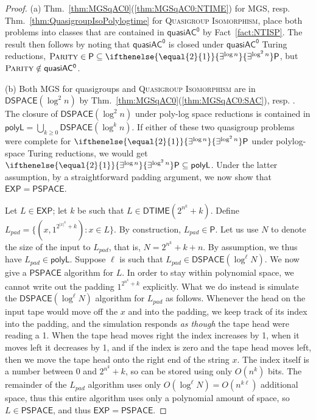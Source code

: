 \documentclass{theoretics}
\newcommand{\algprobm}[1]{\textsc{#1}\xspace}
\newcommand{\betacc}[1]{\ifthenelse{\equal{#1}{1}}{\exists^{\log n}}{\exists^{\log^{#1}n}}} %
\newcommand{\Thm}[1]{Thm.~\ref{#1}\xspace}
\newcommand*{\ComplexityClass}[1]{\ensuremath{\mathsf{#1}}\xspace}
\renewcommand{\P}{\ComplexityClass{P}}
\newcommand*{\EXP}{\ComplexityClass{EXP}}
\newcommand*{\PSPACE}{\ComplexityClass{PSPACE}}
\newcommand{\qACz}{\ComplexityClass{quasiAC^0}}
\newcommand{\DTIME}{\ComplexityClass{DTIME}}
\begin{document}
\begin{proof}
(a) \Thm{thm:MGSqAC0}(\ref{thm:MGSqAC0:NTIME}) for \algprobm{MGS}, resp. \Thm{thm:QuasigroupIsoPolylogtime} for \algprobm{Quasigroup Isomorphism}, place both problems into classes that are contained in $\qACz$ by Fact~\ref{fact:NTISP}. The result then follows by noting that $\qACz$ is closed under $\qACz$ Turing reductions, $\algprobm{Parity} \in \P \subseteq \betacc{2}\P$, but $\algprobm{Parity} \notin \qACz$.

(b) Both \algprobm{MGS} for quasigroups and \algprobm{Quasigroup Isomorphism} are in $\mathsf{DSPACE}(\log^2 n)$ by \Thm{thm:MGSqAC0}(\ref{thm:MGSqAC0:SAC}), resp. \cite{ChattopadhyayToranWagner}. The closure of $\mathsf{DSPACE}(\log^2 n)$ under poly-log space reductions is contained in $\mathsf{polyL} = \bigcup_{k \geq 0} \mathsf{DSPACE}(\log^k n)$. If either of these two quasigroup problems were complete for $\betacc{2} \P$ under polylog-space Turing reductions, we would get $\betacc{2} \P \subseteq \mathsf{polyL}$. Under the latter assumption, by a straightforward padding argument, we now show that $\EXP = \PSPACE$.

Let $L \in \EXP$; let $k$ be such that $L \in \DTIME(2^{n^k}+k)$. Define $L_{pad} = \{(x,1^{2^{|x|^k}+k}) : x \in L\}$. By construction, $L_{pad} \in \P$. Let us use $N$ to denote the size of the input to $L_{pad}$, that is, $N = 2^{n^k}+k+n$. By assumption, we thus have $L_{pad} \in \mathsf{polyL}$. Suppose $\ell$ is such that $L_{pad} \in \mathsf{DSPACE}(\log^\ell N)$. We now give a $\PSPACE$ algorithm for $L$. In order to stay within polynomial space, we cannot write out the padding $1^{2^{n^k}+k}$ explicitly. What we do instead is simulate the $\mathsf{DSPACE}(\log^\ell N)$ algorithm for $L_{pad}$ as follows. Whenever the head on the input tape would move off the $x$ and into the padding, we keep track of its index into the padding, and the simulation responds \emph{as though} the tape head were reading a 1. When the tape head moves right the index increases by 1, when it moves left it decreases by 1, and if the index is zero and the tape head moves left, then we move the tape head onto the right end of the string $x$. The index itself is a number between $0$ and $2^{n^k}+k$, so can be stored using only $O(n^k)$ bits. The remainder of the $L_{pad}$ algorithm uses only $O(\log^\ell N) = O(n^{k\ell})$ additional space, thus this entire algorithm uses only a polynomial amount of space, so $L \in \PSPACE$, and thus $\EXP=\PSPACE$.
\end{proof}
\end{document}
